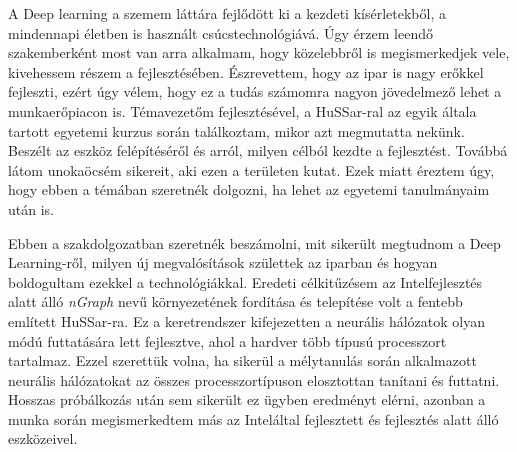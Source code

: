 A Deep learning a szemem láttára fejlődött ki a kezdeti kísérletekből, a mindennapi életben is használt csúcstechnológiává. Úgy érzem leendő szakemberként most van arra alkalmam, hogy közelebbről is megismerkedjek vele, kivehessem részem a fejlesztésében. Észrevettem, hogy az ipar is nagy erőkkel fejleszti, ezért úgy vélem, hogy ez a tudás számomra nagyon jövedelmező lehet a munkaerőpiacon is.
Témavezetőm fejlesztésével, a HuSSar-ral az egyik általa tartott egyetemi kurzus során találkoztam, mikor azt megmutatta nekünk. Beszélt az eszköz felépítéséről és arról, milyen célból kezdte a fejlesztést. Továbbá látom unokaöcsém sikereit, aki ezen a területen kutat. Ezek miatt éreztem úgy, hogy ebben a témában szeretnék dolgozni, ha lehet az egyetemi tanulmányaim után is.

Ebben a szakdolgozatban szeretnék beszámolni, mit sikerült megtudnom a Deep Learning-ről, milyen új megvalósítások születtek az iparban és hogyan boldogultam ezekkel a technológiákkal. Eredeti célkitűzésem az Intel\registeredlogo fejlesztés alatt álló \emph{nGraph} nevű környezetének fordítása és telepítése volt a fentebb említett HuSSar-ra. Ez a keretrendszer kifejezetten a neurális hálózatok olyan módú futtatására lett fejlesztve, ahol a hardver több típusú processzort tartalmaz.
Ezzel szerettük volna, ha sikerül a mélytanulás során alkalmazott neurális hálózatokat az összes processzortípuson elosztottan tanítani és futtatni. Hosszas próbálkozás után sem sikerült ez ügyben eredményt elérni, azonban a munka során megismerkedtem más az Intel\registeredlogo által fejlesztett és fejlesztés alatt álló eszközeivel.
